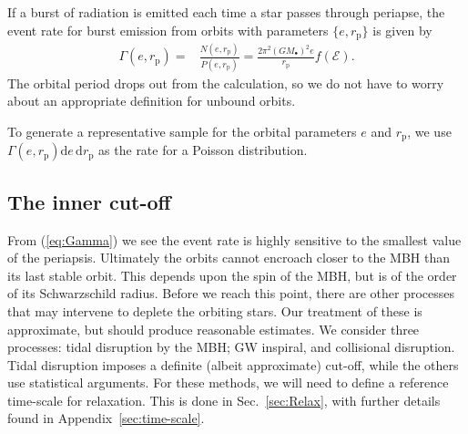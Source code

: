 \documentclass[useAMS,usedcolumn,usegraphicx,usenatbib]{mn2e}
\newcommand{\eqnref}[1]{(\ref{eq:#1})}
\newcommand{\secref}[1]{Sec.~\ref{sec:#1}}
\newcommand{\apref}[1]{Appendix~\ref{sec:#1}}
\newcommand{\sub}[1]{\ensuremath{_\mathrm{#1}}}
\newcommand{\dd}{\ensuremath{\mathrm{d}}}
\begin{document}
If a burst of radiation is emitted each time a star passes through periapse, the event rate for burst emission from orbits with parameters $\{e, r\sub{p}\}$ is given by
\begin{align}
\Gamma(e, r\sub{p}) = {} & \frac{N(e, r\sub{p})}{P(e, r\sub{p})} = \frac{2\pi^2(GM_\bullet)^2 e}{r\sub{p}}f(\mathcal{E}).
\label{eq:Gamma}
\end{align}
The orbital period drops out from the calculation, so we do not have to worry about an appropriate definition for unbound orbits.



To generate a representative sample for the orbital parameters $e$ and $r\sub{p}$, we use $\Gamma(e, r\sub{p})\dd e\, \dd r\sub{p}$ as the rate for a Poisson distribution.

\subsection{The inner cut-off}

From \eqnref{Gamma} we see the event rate is highly sensitive to the smallest value of the periapsis. Ultimately the orbits cannot encroach closer to the MBH than its last stable orbit. This depends upon the spin of the MBH, but is of the order of its Schwarzschild radius. Before we reach this point, there are other processes that may intervene to deplete the orbiting stars. Our treatment of these is approximate, but should produce reasonable estimates. We consider three processes: tidal disruption by the MBH; GW inspiral, and collisional disruption. Tidal disruption imposes a definite (albeit approximate) cut-off, while the others use statistical arguments. For these methods, we will need to define a reference time-scale for relaxation. This is done in \secref{Relax}, with further details found in \apref{time-scale}.
\end{document}
